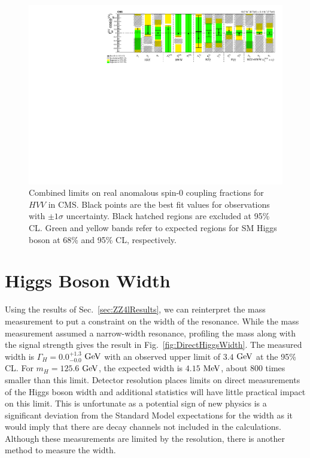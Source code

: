 \begin{figure}[htbp]
\begin{center}
\includegraphics[width=.9\linewidth]{HiggsProperties/figures/Summary_spin0.pdf}
\caption[Summary of Allowed Intervals for Anomalous Spin-0 $HVV$ Couplings for $125.6$ $\rm{GeV}$ Higgs Boson]{Combined limits on real anomalous spin-0 coupling fractions for $HVV$ in CMS. Black points are the best fit values for observations with $\pm1\sigma$ uncertainty. Black hatched regions are excluded at 95\% CL. Green and yellow bands refer to expected regions for SM Higgs boson at 68\% and 95\% CL, respectively.}
\label{fig:Spin0Exclusions_Combined}
\end{center}
\end{figure}

\section{Higgs Boson Width}
\label{sec:Width}

Using the results of Sec.~\ref{sec:ZZ4lResults}, we can reinterpret the mass measurement to put a constraint on the width of the resonance. While the mass measurement assumed a narrow-width resonance, profiling the mass along with the signal strength gives the result in Fig.~\ref{fig:DirectHiggsWidth}. The measured width is $\Gamma_{H} = 0.0^{+1.3}_{-0.0}$ $\rm{GeV}$ with an observed upper limit of $3.4$ $\rm{GeV}$ at the 95\% CL. For $m_H = 125.6$ $\rm{GeV}$, the expected width is $4.15$ $\rm{MeV}$, about 800 times smaller than this limit. Detector resolution places limits on direct measurements of the Higgs boson width and additional statistics will have little practical impact on this limit. This is unfortunate as a potential sign of new physics is a significant deviation from the Standard Model expectations for the width as it would imply that there are decay channels not included in the calculations. Although these measurements are limited by the resolution, there is another method to measure the width.

